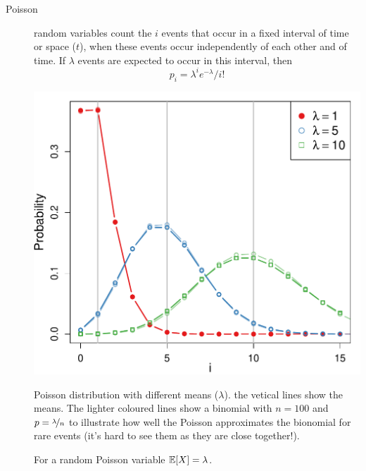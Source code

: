 \begin{description}
\item[Poisson] random variables count the $i$ events that occur in a
  fixed interval of time or space ($t$), when these events occur independently of
  each other and of time. If $\lambda$ events are
  expected to occur in this interval, then
 \begin{equation}
p_i = \lambda^i e^{-\lambda}/i!
\end{equation}
    \begin{marginfigure}
 \begin{center}
   \includegraphics[width=\textwidth]{math_background/dist_pics/Poisson.pdf}\end{center}
 \caption{Poisson distribution with different means ($\lambda$). the
   vetical lines show the means. The lighter coloured lines show a
   binomial with $n=100$ and $p=\nicefrac{\lambda}{n}$ to illustrate
   how well the Poisson approximates the bionomial for rare events
   (it's hard to see them as they are close together!). 
   }\label{Fig:poisson}
 \end{marginfigure}
 For a random Poisson variable $\mathbb{E}[X]=\lambda$.


\end{description}
